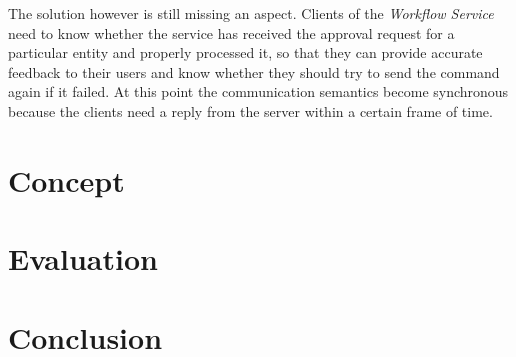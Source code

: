 The solution however is still missing an aspect.
Clients of the \emph{Workflow Service} need to know whether the service has received the approval request for a particular entity and properly processed it, so that they can provide accurate feedback to their users and know whether they should try to send the command again if it failed.
At this point the communication semantics become synchronous because the clients need a reply from the server within a certain frame of time.



\section{Concept}\label{sec:concept}

\section{Evaluation}\label{sec:evaluation}

\section{Conclusion}\label{sec:conclusion}
